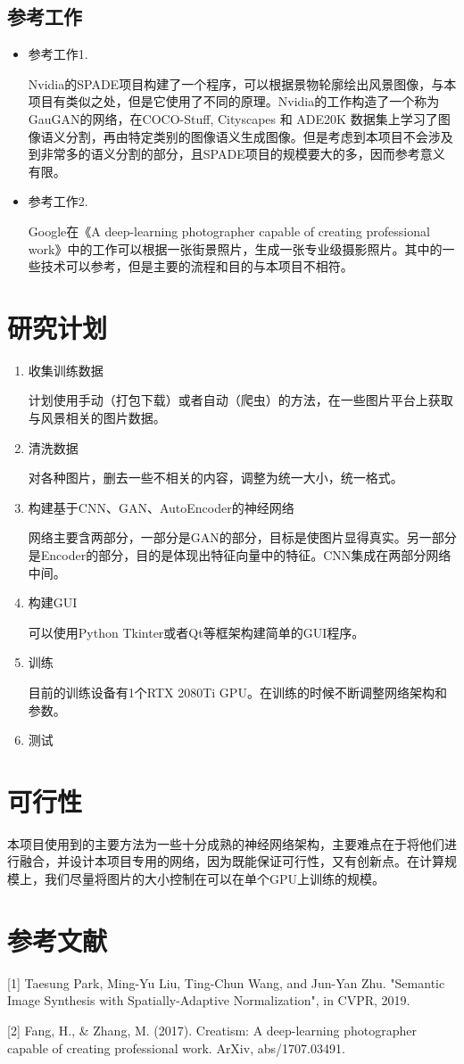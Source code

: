 \documentclass{article}
\begin{document}
\subsection{参考工作}

\begin{itemize}

\item 参考工作1.

Nvidia的SPADE项目构建了一个程序，可以根据景物轮廓绘出风景图像，与本项目有类似之处，但是它使用了不同的原理。Nvidia的工作构造了一个称为GauGAN的网络，在COCO-Stuff, Cityscapes 和 ADE20K 数据集上学习了图像语义分割，再由特定类别的图像语义生成图像。但是考虑到本项目不会涉及到非常多的语义分割的部分，且SPADE项目的规模要大的多，因而参考意义有限。
\item 参考工作2.

Google在《A deep-learning photographer capable of creating professional work》中的工作可以根据一张街景照片，生成一张专业级摄影照片。其中的一些技术可以参考，但是主要的流程和目的与本项目不相符。
\end{itemize}

\section{研究计划}

\begin{enumerate}
	\item 收集训练数据
	
	计划使用手动（打包下载）或者自动（爬虫）的方法，在一些图片平台上获取与风景相关的图片数据。
	\item 清洗数据
  
  对各种图片，删去一些不相关的内容，调整为统一大小，统一格式。
	\item 构建基于CNN、GAN、AutoEncoder的神经网络
  
  网络主要含两部分，一部分是GAN的部分，目标是使图片显得真实。另一部分是Encoder的部分，目的是体现出特征向量中的特征。CNN集成在两部分网络中间。
	\item 构建GUI
  
  可以使用Python Tkinter或者Qt等框架构建简单的GUI程序。
	\item 训练
  
  目前的训练设备有1个RTX 2080Ti GPU。在训练的时候不断调整网络架构和参数。
	\item 测试
\end{enumerate}

\section{可行性}
本项目使用到的主要方法为一些十分成熟的神经网络架构，主要难点在于将他们进行融合，并设计本项目专用的网络，因为既能保证可行性，又有创新点。在计算规模上，我们尽量将图片的大小控制在可以在单个GPU上训练的规模。

\section{参考文献}
[1] Taesung Park, Ming-Yu Liu, Ting-Chun Wang, and Jun-Yan Zhu.
"Semantic Image Synthesis with Spatially-Adaptive Normalization", in CVPR, 2019.

[2] Fang, H., & Zhang, M. (2017). Creatism: A deep-learning photographer capable of creating professional work. ArXiv, abs/1707.03491.
\end{document}
